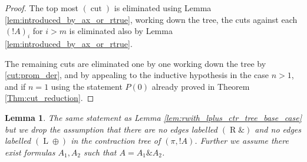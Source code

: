 \documentclass[12pt]{article}
\theoremstyle{plain}
\newtheorem{lemma}[thm]{Lemma}
\theoremstyle{definition}
\newcommand{\rwith}{(\operatorname{R}\&)}
\newcommand{\lplus}{(\operatorname{L}\oplus)}
\newcommand{\cut}{(\operatorname{cut})}
\begin{document}
\begin{proof}
The top most $\cut$ is eliminated using Lemma \ref{lem:introduced_by_ax_or_rtrue}, working down the tree, the cuts against each $(!A)_i$ for $i > m$ is eliminated also by Lemma \ref{lem:introduced_by_ax_or_rtrue}.

The remaining cuts are eliminated one by one working down the tree by \eqref{cut:prom_der}, and by appealing to the inductive hypothesis in the case $n > 1$, and if $n = 1$ using the statement $P(0)$ already proved in Theorem \ref{Thm:cut_reduction}.
\end{proof}
\begin{lemma}\label{lem:right_logical_or_prom_vs_active_ctr_or_rwith}
The same statement as Lemma \ref{lem:rwith_lplus_ctr_tree_base_case} but we drop the assumption that there are no edges labelled $\rwith$ and no edges labelled $\lplus$ in the contraction tree of $(\pi, !A)$. Further we assume there exist formulas $A_1,A_2$ such that $A = A_1 \& A_2$.
\end{lemma}
\end{document}

